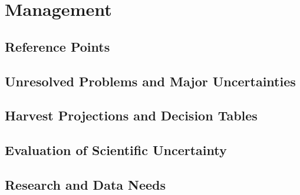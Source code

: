 \documentclass[11pt,
  english,
  a4paper,
]{article}
\begin{document}
\leavevmode\tagmcend\tagstructend


\hypertarget{management}{%
\section{Management}\label{management}}

\leavevmode\tagmcend\tagstructend


\hypertarget{reference-points-2}{%
\subsection{Reference Points}\label{reference-points-2}}

\leavevmode\tagmcend\tagstructend


\hypertarget{unresolved-problems-and-major-uncertainties-2}{%
\subsection{Unresolved Problems and Major Uncertainties}\label{unresolved-problems-and-major-uncertainties-2}}

\leavevmode\tagmcend\tagstructend


\hypertarget{harvest-projections-and-decision-tables}{%
\subsection{Harvest Projections and Decision Tables}\label{harvest-projections-and-decision-tables}}

\leavevmode\tagmcend\tagstructend


\hypertarget{evaluation-of-scientific-uncertainty}{%
\subsection{Evaluation of Scientific Uncertainty}\label{evaluation-of-scientific-uncertainty}}

\leavevmode\tagmcend\tagstructend


\hypertarget{research-and-data-needs-1}{%
\subsection{Research and Data Needs}\label{research-and-data-needs-1}}
\end{document}

